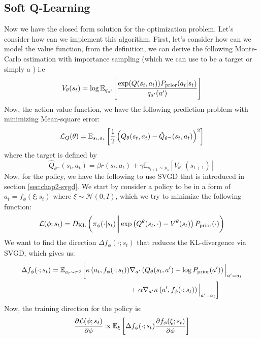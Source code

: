 \subsection{Soft Q-Learning}
\label{sec:chap2-soft-q-implementation}
Now we have the closed form solution for the optimization problem. Let's consider how can we implement this algorithm. First, let's consider how can we model the value function, from the definition, we can derive the following Monte-Carlo estimation with importance sampling (which we can use to be a target or simply a ) i.e 
\begin{equation}
    V_{\theta}(s_t) = \log \mathbb{E}_{q_{a'}}\Bigg[ \frac{\exp(Q(s_t, a_t)) P_{\text{prior}}(a_t | s_t)}{q_{a'}(a')} \Bigg]
\end{equation}
Now, the action value function, we have the following prediction problem with minimizing Mean-square error:
\begin{equation}
\label{eqn:chap2-soft-Q-mse}
    \mathcal{L}_Q(\theta) = \mathbb{E}_{s_t, a_t}\left[ \frac{1}{2} \left( Q_{\theta}(s_t, a_t) - \hat{Q}_{\theta^-}(s_t, a_t)  \right)^2 \right]
\end{equation}
where the target is defined by
\begin{equation}
\label{eqn:chap2-soft-Q-mse-target}
    \hat{Q}_{\theta^-}(s_t, a_t) = \beta r(s_t, a_t) + \gamma \mathbb{E}_{s_{t+1} \sim p_{s}}\left[ V_{\theta^-}(s_{t+1}) \right]
\end{equation}
Now, for the policy, we have the following to use SVGD that is introduced in section \ref{sec:chap2-svgd}. We start by consider a policy to be in a form of $a_t = f_{\phi}(\xi ; s_t)$ where $\xi \sim \mathcal{N}(0, I)$, which we try to minimize the following function:
\begin{equation}
    \mathcal{L}(\phi ; s_t) = D_{\mathrm{KL}}\left( \pi_{\phi}(\cdot | s_t) \bigg\| \exp\left( Q^{\theta}(s_t, \cdot) - V^{\theta}(s_t)  \right) P_{\text{prior}}(\cdot) \right)
\end{equation}
We want to find the direction $\Delta f_{\phi}(\cdot ; s_t)$ that reduces the KL-divergence via SVGD, which gives us:
\begin{equation}
    \begin{aligned}
        \Delta f_{\phi}(\cdot ; s_t) = \mathbb{E}_{a_t \sim \pi^{\phi}}\bigg[ \kappa \left( a_t, f_{\phi}(\cdot ; s_t) \right) &\nabla_{a'} \left( Q_{\theta}(s_t, a') + \log P_{\text{prior}}(a') \right) \Big|_{a' = a_t} \\
        &+ \alpha \nabla_{a'} \kappa \left( a', f_{\phi}(\cdot ; s_t) \right) \Big|_{a' = a_t} \bigg]
    \end{aligned}
\end{equation}
Now, the training direction for the policy is:
\begin{equation}
    \frac{\partial \mathcal{L}(\phi ; s_t)}{\partial \phi} \propto \mathbb{E}_{\xi} \left[ \Delta f_{\phi}(\cdot ; s_t) \frac{\partial f_{\phi}(\xi ; s_t)}{\partial \phi} \right]
\end{equation}

